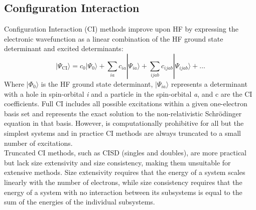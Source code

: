 \subsection{Configuration Interaction}
Configuration Interaction (CI)\cite{shavitt2009many,sherrill1999configuration} methods improve upon HF by expressing the electronic wavefunction as a linear combination of the HF ground state determinant and excited determinants:
\begin{equation} \label{eq:CI}
     |\Psi_{\mathrm{CI}} \rangle = c_0 |\Psi_0 \rangle + \sum_{ia} c_{ia} |\Psi_{ia} \rangle + \sum_{ijab} c_{ijab} |\Psi_{ijab} \rangle + \dots
\end{equation}
Where $|\Phi_0 \rangle$ is the HF ground state determinant, $|\Psi_{ia} \rangle$ represents a determinant with a hole in spin-orbital \textit{i} and a particle in the spin-orbital \textit{a}, and c are the CI coefficients. Full CI includes all possible excitations within a given one-electron basis set and represents the exact solution to the non-relativistic Schrödinger equation in that basis. However, is computationally prohibitive for all but the simplest systems and in practice CI methods are always truncated to a small number of excitations.\\

Truncated CI methods, such as CISD (singles and doubles), are more practical but lack size extensivity and size consistency, making them unsuitable for extensive methods. Size extensivity\cite{bartlett1978many} requires that the energy of a system scales linearly with the number of electrons, while size consistency\cite{pople1976theoretical} requires that the energy of a system with no interaction between its subsystems is equal to the sum of the energies of the individual subsystems.

